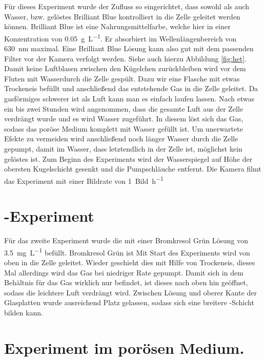 Für dieses Experiment wurde der Zufluss so eingerichtet, dass sowohl \COT als auch Wasser, bzw. gelöstes Brilliant Blue kontrolliert in die Zelle geleitet werden können. Brilliant Blue ist eine Nahrungsmittelfarbe, welche hier in einer Konzentration von \SI{0,05}{\gram\per\liter}. Er absorbiert im Wellenlängenbereich von \SI{630}{\nano\meter} maximal. Eine Brilliant Blue Lösung kann also gut mit dem passenden Filter vor der Kamera verfolgt werden. Siehe auch hierzu Abbildung \ref{fig:het}.
Damit keine Luftblasen zwischen den Kügelchen zurückbleiben wird vor dem Fluten mit Wasser\COT durch die Zelle gespült. Dazu wir eine Flasche mit etwas Trockeneis befüllt und anschließend das entstehende Gas in die Zelle geleitet. Da gasförmiges \COT schwerer ist als Luft kann man es einfach laufen lassen. Nach etwas ein bis zwei Stunden wird angenommen, dass die gesamte Luft aus der Zelle verdrängt wurde und es wird Wasser zugeführt. In diesem löst sich das Gas, sodass das poröse Medium komplett mit Wasser gefüllt ist. Um unerwartete Efekte zu vermeiden wird anschließend noch länger Wasser durch die Zelle gepumpt, damit im Wasser, dass letztendlich in der Zelle ist, möglichst kein gelöstes \COT ist.
Zum Beginn des Experiments wird der Wasserspiegel auf Höhe der obersten Kugelschicht gesenkt und die Pumpschläuche entfernt.
Die Kamera filmt das Experiment mit einer Bildrate von \SI{1}{Bild\per\hour}



\section{\COT-Experiment}
\label{set:cot}
Für das zweite Experiment wurde die \HSCs mit einer Bromkresol Grün Lösung von \SI{3,5}{\milli\gram\per\liter} befüllt. 
Bromkresol Grün ist 
Mit Start des Experiments wird von oben \COT in die Zelle geleitet. Wieder geschieht dies mit Hilfe von Trockeneis, dieses Mal allerdings wird das Gas bei niedriger Rate gepumpt. Damit sich in dem Behältnis für das Gas wirklich nur \COT befindet, ist dieses nach oben hin geöffnet, sodass die leichtere Luft verdrängt wird. Zwischen Lösung und oberer Kante der Glasplatten wurde ausreichend Platz gelassen, sodass sich eine breitere \COT-Schicht bilden kann.

\section{\COT Experiment im porösen Medium.}
\label{set:cpm}
